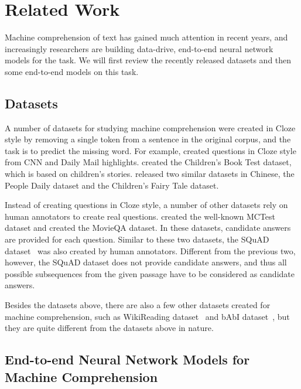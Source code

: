 \documentclass{article} \usepackage{iclr2017_conference,times}
\begin{document}
 \section{Related Work}
Machine comprehension of text has gained much attention in recent years, and increasingly researchers are building data-drive, end-to-end neural network models for the task.
We will first review the recently released datasets and then some end-to-end models on this task.

\subsection{Datasets}
A number of datasets for studying machine comprehension were created in Cloze style by removing a single token from a sentence in the original corpus, and the task is to predict the missing word.
For example, \citet{hermann2015teaching:nips2015} created questions in Cloze style from CNN and Daily Mail highlights.
\citet{hill2015goldilocks:ICLR2016} created the Children's Book Test dataset, which is based on children's stories.
\citet{cui2016consensus:arxiv} released two similar datasets in Chinese, the People Daily dataset and the Children's Fairy Tale dataset.




Instead of creating questions in Cloze style, a number of other datasets rely on human annotators to create real questions.
\citet{richardsonmctest:EMNLP2013} created the well-known MCTest dataset
and \citet{MovieQA:cvpr2016} created the MovieQA dataset.
In these datasets, candidate answers are provided for each question.
Similar to these two datasets, the SQuAD dataset~\citep{rajpurkar2016squad} was also created by human annotators.
Different from the previous two, however, the SQuAD dataset does not provide candidate answers, and thus all possible subsequences from the given passage have to be considered as candidate answers.

Besides the datasets above, there are also a few other datasets created for machine comprehension, such as WikiReading dataset~\citep{hewlettwikireading:acl2016} and bAbI dataset~\citep{weston2015towards:ICLR2016}, but they are quite different from the datasets above in nature.









\subsection{End-to-end Neural Network Models for Machine Comprehension}
\end{document}
